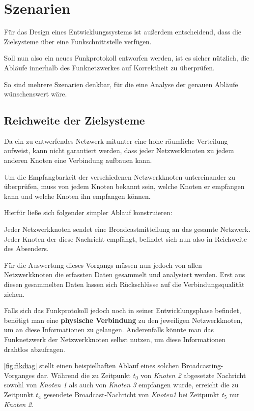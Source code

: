 \section{Szenarien}\label{sect:szenarien}
Für das Design eines Entwicklungssystems ist außerdem entscheidend, dass die
Zielsysteme über eine Funkschnittstelle verfügen.

Soll nun also ein neues Funkprotokoll entworfen werden, ist es sicher nützlich,
die Abläufe innerhalb des Funknetzwerkes auf Korrektheit zu überprüfen.

So sind mehrere Szenarien denkbar, für die eine Analyse der genauen Abläufe
wünschenswert wäre.

\subsection{Reichweite der Zielsysteme}
Da ein zu entwerfendes Netzwerk mitunter eine hohe räumliche Verteilung
aufweist, kann nicht garantiert werden, dass jeder Netzwerkknoten zu jedem
anderen Knoten eine Verbindung aufbauen kann.

Um die Empfangbarkeit der verschiedenen Netzwerkknoten untereinander zu
überprüfen, muss von jedem Knoten bekannt sein, welche Knoten er empfangen kann
und welche Knoten ihn empfangen können.

Hierfür ließe sich folgender simpler Ablauf konstruieren:

Jeder Netzwerkknoten sendet eine Broadcastmitteilung an das gesamte Netzwerk.
Jeder Knoten der diese Nachricht empfängt, befindet sich nun also in Reichweite
des Absenders.

Für die Auswertung dieses Vorgangs müssen nun jedoch von allen Netzwerkknoten
die erfassten Daten gesammelt und analysiert werden. Erst aus diesen gesammelten
Daten lassen sich Rückschlüsse auf die Verbindungsqualität ziehen.

Falls sich das Funkprotokoll jedoch noch in seiner Entwicklungsphase befindet,
benötigt man eine \textbf{physische Verbindung} zu den jeweiligen
Netzwerkknoten, um an diese Informationen zu gelangen. Anderenfalls könnte man
das Funknetzwerk der Netzwerkknoten selbst nutzen, um diese Informationen
drahtlos abzufragen.

\autoref{fig:fikdiag} stellt einen beispielhaften Ablauf eines solchen
Broadcasting-Vorganges dar. Während die zu Zeitpunkt $t_0$ von \emph{Knoten 2}
abgesetzte Nachricht sowohl von \emph{Knoten 1} als auch von \emph{Knoten 3}
empfangen wurde, erreicht die zu Zeitpunkt $t_4$ gesendete Broadcast-Nachricht
von \emph{Knoten1} bei Zeitpunkt $t_5$ nur \emph{Knoten 2}.


